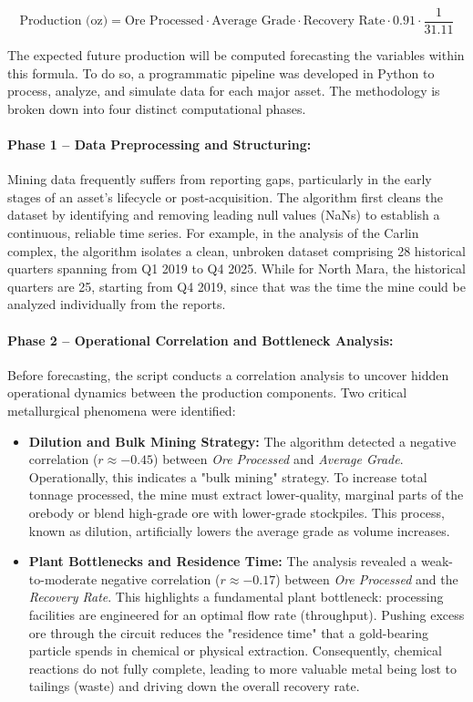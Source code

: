 \begin{equation}
    \text{Production (oz)} = \text{Ore Processed} \cdot \text{Average Grade} \cdot \text{Recovery Rate} \cdot 0.91 \cdot \frac{1}{31.11}  
\end{equation}

The expected future production will be computed forecasting the variables within this formula. To do so, a programmatic pipeline was developed in Python to process, analyze, and simulate data for each major asset. The methodology is broken down into four distinct computational phases.

\paragraph{Phase 1 -- Data Preprocessing and Structuring:}
Mining data frequently suffers from reporting gaps, particularly in the early stages of an asset's lifecycle or post-acquisition. The algorithm first cleans the dataset by identifying and removing leading null values (NaNs) to establish a continuous, reliable time series. For example, in the analysis of the Carlin complex, the algorithm isolates a clean, unbroken dataset comprising 28 historical quarters spanning from Q1 2019 to Q4 2025. While for North Mara, the historical quarters are 25, starting from Q4 2019, since that was the time the mine could be analyzed individually from the reports.

\paragraph{Phase 2 -- Operational Correlation and Bottleneck Analysis:}
Before forecasting, the script conducts a correlation analysis to uncover hidden operational dynamics between the production components. Two critical metallurgical phenomena were identified:

\begin{itemize}
    \item \textbf{Dilution and Bulk Mining Strategy:} The algorithm detected a negative correlation ($ r\approx -0.45$) between \textit{Ore Processed} and \textit{Average Grade}. Operationally, this indicates a "bulk mining" strategy. To increase total tonnage processed, the mine must extract lower-quality, marginal parts of the orebody or blend high-grade ore with lower-grade stockpiles. This process, known as dilution, artificially lowers the average grade as volume increases.
    
    \item \textbf{Plant Bottlenecks and Residence Time:} The analysis revealed a weak-to-moderate negative correlation ($r \approx -0.17$) between \textit{Ore Processed} and the \textit{Recovery Rate}. This highlights a fundamental plant bottleneck: processing facilities are engineered for an optimal flow rate (throughput). Pushing excess ore through the circuit reduces the "residence time" that a gold-bearing particle spends in chemical or physical extraction. Consequently, chemical reactions do not fully complete, leading to more valuable metal being lost to tailings (waste) and driving down the overall recovery rate.
\end{itemize}



